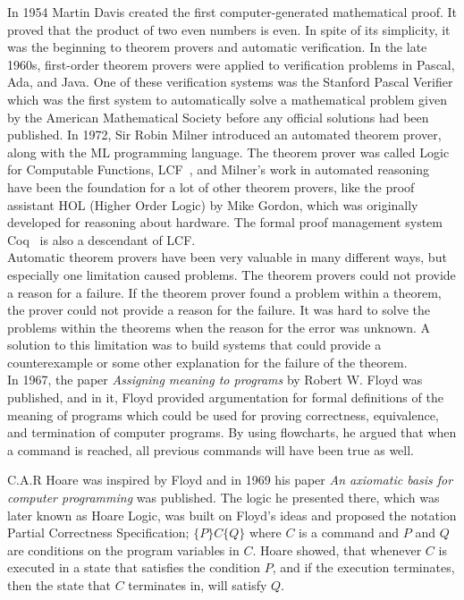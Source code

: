 In 1954 Martin Davis created the first computer-generated mathematical proof. It proved that the product of two even numbers is even. In spite of its simplicity, it was the beginning to theorem provers and automatic verification.
In the late 1960s, first-order theorem provers were applied to verification problems in Pascal, Ada, and Java. One of these verification systems was the Stanford Pascal Verifier\cite{Luckham1979} which was the first system to automatically solve a mathematical problem given by the American Mathematical Society before any official solutions had been published.
In 1972, Sir Robin Milner introduced an automated theorem prover, along with the ML programming language. The theorem prover was called Logic for Computable Functions, LCF~\cite{Milner1972}, and Milner's work in automated reasoning have been the foundation for a lot of other theorem provers, like the proof assistant HOL (Higher Order Logic) by Mike Gordon, which was originally developed for reasoning about hardware. The formal proof management system Coq~\cite{coq} is also a descendant of LCF.\\

Automatic theorem provers have been very valuable in many different ways, but especially one limitation caused problems. The theorem provers could not provide a reason for a failure. If the theorem prover found a problem within a theorem, the prover could not provide a reason for the failure. It was hard to solve the problems within the theorems when the reason for the error was unknown. A solution to this limitation was to build systems that could provide a counterexample or some other explanation for the failure of the theorem. \\

In 1967, the paper \textit{Assigning meaning to programs}\cite{Floyd1967} by Robert W. Floyd was published, and in it, Floyd provided argumentation for formal definitions of the meaning of programs which could be used for proving correctness, equivalence, and termination of computer programs. By using flowcharts, he argued that when a command is reached, all previous commands will have been true as well.

C.A.R Hoare was inspired by Floyd and in 1969 his paper \textit{An axiomatic basis for computer programming}\cite{Hoare1969} was published. The logic he presented there, which was later known as Hoare Logic, was built on Floyd's ideas and proposed the notation Partial Correctness Specification; $\{P\} C \{Q\}$ where $C$ is a command and $P$ and $Q$ are conditions on the program variables in $C$. Hoare showed, that whenever $C$ is executed in a state that satisfies the condition $P$, and if the execution terminates, then the state that $C$ terminates in, will satisfy $Q$.


